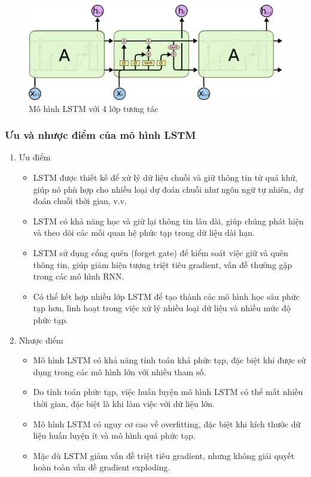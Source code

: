 \begin{figure}[H]
    \centering
    \includegraphics[width=14cm]{Images/Theoretical basis/LSTM.png}
\caption{Mô hình LSTM với 4 lớp tương tác}
\end{figure}

\subsubsection{Ưu và nhược điểm của mô hình LSTM}

\begin{enumerate}[-]
    \item Ưu điểm
    \begin{itemize}
        \item LSTM được thiết kế để xử lý dữ liệu chuỗi và giữ thông tin từ quá khứ, giúp nó phù hợp cho nhiều loại dự đoán chuỗi như ngôn ngữ tự nhiên, dự đoán chuỗi thời gian, v.v.
        \item LSTM có khả năng học và giữ lại thông tin lâu dài, giúp chúng phát hiện và theo dõi các mối quan hệ phức tạp trong dữ liệu dài hạn.
        \item LSTM sử dụng cổng quên (forget gate) để kiểm soát việc giữ và quên thông tin, giúp giảm hiện tượng triệt tiêu gradient, vấn đề thường gặp trong các mô hình RNN.
        \item Có thể kết hợp nhiều lớp LSTM để tạo thành các mô hình học sâu phức tạp hơn, linh hoạt trong việc xử lý nhiều loại dữ liệu và nhiều mức độ phức tạp.
    \end{itemize}
    \item  Nhược điểm
    \begin{itemize}
        \item Mô hình LSTM có khả năng tính toán khá phức tạp, đặc biệt khi được sử dụng trong các mô hình lớn với nhiều tham số.
        \item Do tính toán phức tạp, việc huấn luyện mô hình LSTM có thể mất nhiều thời gian, đặc biệt là khi làm việc với dữ liệu lớn.
        \item Mô hình LSTM có nguy cơ cao về overfitting, đặc biệt khi kích thước dữ liệu huấn luyện ít và mô hình quá phức tạp.
        \item Mặc dù LSTM giảm vấn đề triệt tiêu gradient, nhưng không giải quyết hoàn toàn vấn đề gradient exploding.
    \end{itemize}
\end{enumerate}


